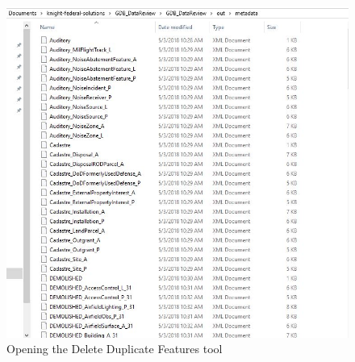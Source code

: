\documentclass[openany]{book}
\theoremstyle{definition}
\theoremstyle{definition}
\theoremstyle{definition}
\theoremstyle{remark}
\begin{document}
\begin{figure}[H]

{\centering \includegraphics{figures/exMeta-after} 

}

\caption{Opening the Delete Duplicate Features tool}\label{fig:imMetaafter}
\end{figure}


\end{document}

